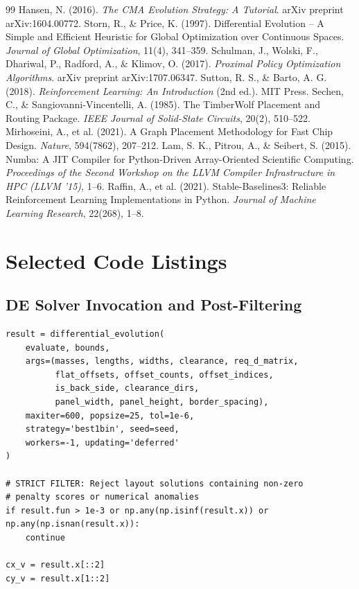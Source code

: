 \documentclass[11pt,a4paper,oneside]{report}
\begin{document}
\begin{thebibliography}{99}
 Hansen, N. (2016). \emph{The CMA Evolution Strategy: A Tutorial}. arXiv preprint arXiv:1604.00772.
 Storn, R., \& Price, K. (1997). Differential Evolution -- A Simple and Efficient Heuristic for Global Optimization over Continuous Spaces. \emph{Journal of Global Optimization}, 11(4), 341--359.
 Schulman, J., Wolski, F., Dhariwal, P., Radford, A., \& Klimov, O. (2017). \emph{Proximal Policy Optimization Algorithms}. arXiv preprint arXiv:1707.06347.
 Sutton, R. S., \& Barto, A. G. (2018). \emph{Reinforcement Learning: An Introduction} (2nd ed.). MIT Press.
 Sechen, C., \& Sangiovanni-Vincentelli, A. (1985). The TimberWolf Placement and Routing Package. \emph{IEEE Journal of Solid-State Circuits}, 20(2), 510--522.
 Mirhoseini, A., et al. (2021). A Graph Placement Methodology for Fast Chip Design. \emph{Nature}, 594(7862), 207--212.
 Lam, S. K., Pitrou, A., \& Seibert, S. (2015). Numba: A JIT Compiler for Python-Driven Array-Oriented Scientific Computing. \emph{Proceedings of the Second Workshop on the LLVM Compiler Infrastructure in HPC (LLVM '15)}, 1--6.
 Raffin, A., et al. (2021). Stable-Baselines3: Reliable Reinforcement Learning Implementations in Python. \emph{Journal of Machine Learning Research}, 22(268), 1--8.
\end{thebibliography}

\appendix
\chapter{Selected Code Listings}

\section{DE Solver Invocation and Post-Filtering}
\begin{lstlisting}[caption={Full DE solver invocation and strict-compliance post-filter (\texttt{DE/de.py})}]
result = differential_evolution(
    evaluate, bounds,
    args=(masses, lengths, widths, clearance, req_d_matrix,
          flat_offsets, offset_counts, offset_indices,
          is_back_side, clearance_dirs,
          panel_width, panel_height, border_spacing),
    maxiter=600, popsize=25, tol=1e-6,
    strategy='best1bin', seed=seed,
    workers=-1, updating='deferred'
)

# STRICT FILTER: Reject layout solutions containing non-zero
# penalty scores or numerical anomalies
if result.fun > 1e-3 or np.any(np.isinf(result.x)) or np.any(np.isnan(result.x)):
    continue

cx_v = result.x[::2]
cy_v = result.x[1::2]
\end{lstlisting}
\end{document}
